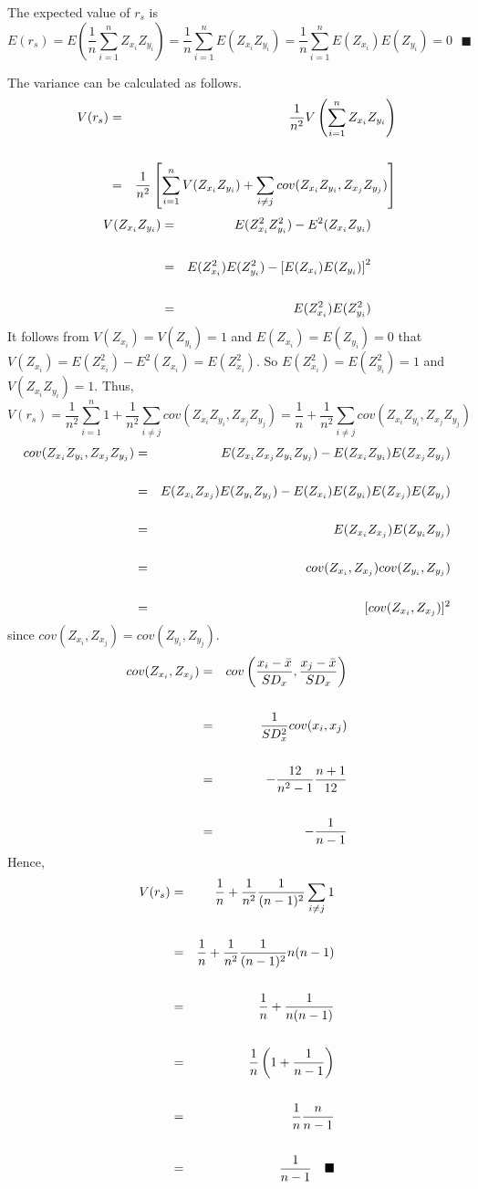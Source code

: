 \documentclass[11pt]{article}
\newcommand{\beq}{\begin{equation}}
\newcommand{\eeq}{\end{equation}}
\newcommand{\beqn}{\begin{eqnarray}}
\newcommand{\eeqn}{\end{eqnarray}}
\numberwithin{equation}{section}
\begin{document}
The expected value of $r_s$ is 
\[
  E(r_s) = E\left( \frac{1}{n} \sum_{i=1}^n Z_{x_i} Z_{y_i} \right) 
= \frac{1}{n} \sum_{i=1}^n E(Z_{x_i} Z_{y_i}) 
= \frac{1}{n} \sum_{i=1}^n E(Z_{x_i}) E(Z_{y_i}) = 0 \ \ \ \blacksquare
\]

The variance can be calculated as follows.
\beqn
   V(r_s) &=& \frac{1}{n^2} V \left( \sum_{i=1}^n Z_{x_i} Z_{y_i} \right) \cr \cr
 &=& \frac{1}{n^2} \left[ \sum_{i=1}^n V(Z_{x_i} Z_{y_i}) + \sum_{i\neq j} cov(Z_{x_i} Z_{y_i}, Z_{x_j} Z_{y_j}) 
\right]
\eeqn
\beqn
  V(Z_{x_i} Z_{y_i}) &=& E(Z_{x_i}^2 Z_{y_i}^2) - E^2(Z_{x_i} Z_{y_i}) \cr \cr 
&=& E(Z_{x_i}^2) E(Z_{y_i}^2) - \left[E(Z_{x_i}) E(Z_{y_i})\right]^2 \cr \cr 
&=& E(Z_{x_i}^2) E(Z_{y_i}^2) \nonumber 
\eeqn
It follows from $V(Z_{x_i})=V(Z_{y_i})=1$ and $E(Z_{x_i})=E(Z_{y_i})=0$ that 
$V(Z_{x_i})=E(Z_{x_i}^2)-E^2(Z_{x_i})=E(Z_{x_i}^2)$. So $E(Z_{x_i}^2)=E(Z_{y_i}^2)=1$ and 
$V(Z_{x_i} Z_{y_i})=1$. Thus, 
\beq
  V(r_s) = \frac{1}{n^2} \sum_{i=1}^n 1 + \frac{1}{n^2}\sum_{i\neq j} cov(Z_{x_i} Z_{y_i}, Z_{x_j} Z_{y_j}) 
= \frac{1}{n} + \frac{1}{n^2} \sum_{i\neq j} cov(Z_{x_i} Z_{y_i}, Z_{x_j} Z_{y_j}) 
\eeq
\beqn
  cov(Z_{x_i} Z_{y_i}, Z_{x_j} Z_{y_j}) &=& E(Z_{x_i} Z_{x_j} Z_{y_i} Z_{y_j}) 
- E(Z_{x_i} Z_{y_i}) E(Z_{x_j} Z_{y_j}) \cr \cr
&=& E(Z_{x_i} Z_{x_j}) E(Z_{y_i} Z_{y_j}) - E(Z_{x_i})E(Z_{y_i})E(Z_{x_j})E(Z_{y_j}) \cr \cr
&=& E(Z_{x_i} Z_{x_j}) E(Z_{y_i} Z_{y_j}) \cr \cr
&=& cov(Z_{x_i},Z_{x_j}) cov(Z_{y_i},Z_{y_j}) \cr \cr
&=& [ cov(Z_{x_i},Z_{x_j}) ]^2 
\eeqn
since $cov(Z_{x_i},Z_{x_j})=cov(Z_{y_i},Z_{y_j})$. 
\beqn
  cov(Z_{x_i},Z_{x_j}) &=& cov\left( \frac{x_i-\bar{x}}{SD_x}, \frac{x_j-\bar{x}}{SD_x} \right) \cr \cr
&=& \frac{1}{SD_x^2} cov(x_i,x_j) \cr \cr 
&=& -\frac{12}{n^2-1} \frac{n+1}{12} \cr \cr 
&=& -\frac{1}{n-1}
\eeqn
Hence, 
\beqn
  V(r_s) &=& \frac{1}{n} +\frac{1}{n^2} \frac{1}{(n-1)^2} \sum_{i \neq j} 1 \cr \cr 
  &=& \frac{1}{n} +\frac{1}{n^2} \frac{1}{(n-1)^2} n (n-1) \cr \cr 
  &=& \frac{1}{n} + \frac{1}{n(n-1)} \cr \cr 
  &=& \frac{1}{n} \left(1 + \frac{1}{n-1}\right) \cr \cr 
  &=& \frac{1}{n} \frac{n}{n-1} \cr \cr 
  &=& \frac{1}{n-1} \ \ \ \blacksquare
\eeqn
\end{document}
